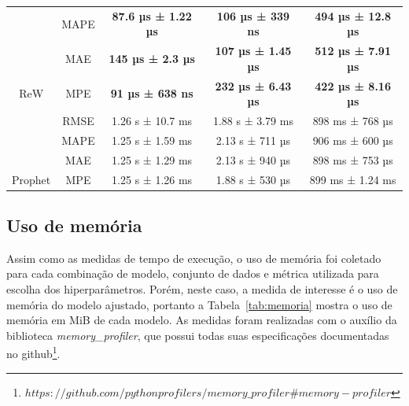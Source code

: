 \begin{table}[htbp]
\begin{tabular}{@{}ccccc@{}}
                                  & MAPE                      & \multicolumn{1}{c}{\textbf{87.6 µs ± 1.22 µs}} & \multicolumn{1}{c}{\textbf{106 µs ± 339 ns}}  & \textbf{494 µs ± 12.8 µs} \\
                                  & MAE                       & \multicolumn{1}{c}{\textbf{145 µs ± 2.3 µs}}   & \multicolumn{1}{c}{\textbf{107 µs ± 1.45 µs}} & \textbf{512 µs ± 7.91 µs} \\
        \multirow{-4}{*}{ReW}     & MPE                       & \multicolumn{1}{c}{\textbf{91 µs ± 638 ns}}    & \multicolumn{1}{c}{\textbf{232 µs ± 6.43 µs}} & \textbf{422 µs ± 8.16 µs} \\ \midrule
                                  & RMSE                      & \multicolumn{1}{c}{1.26 s ± 10.7 ms}           & \multicolumn{1}{c}{1.88 s ± 3.79 ms}          & 898 ms ± 768 µs           \\
                                  & MAPE                      & \multicolumn{1}{c}{1.25 s ± 1.59 ms}           & \multicolumn{1}{c}{2.13 s ± 711 µs}           & 906 ms ± 600 µs           \\
                                  & MAE                       & \multicolumn{1}{c}{1.25 s ± 1.29 ms}           & \multicolumn{1}{c}{2.13 s ± 940 µs}           & 898 ms ± 753 µs           \\
        \multirow{-4}{*}{Prophet} & MPE                       & \multicolumn{1}{c}{1.25 s ± 1.26 ms}           & \multicolumn{1}{c}{1.88 s ± 530 µs}           & 899 ms ± 1.24 ms          \\ \bottomrule
    \end{tabular}
\end{table}

\FloatBarrier

\subsection{Uso de memória}
Assim como as medidas de tempo de execução, o uso de memória foi coletado para cada combinação de modelo, conjunto de dados e métrica utilizada para escolha dos hiperparâmetros. Porém, neste caso, a medida de interesse é o uso de memória do modelo ajustado, portanto a Tabela~\ref{tab:memoria} mostra o uso de memória em MiB de cada modelo. As medidas foram realizadas com o auxílio da biblioteca \textit{memory\_profiler}, que possui todas suas especificações documentadas no github\footnote{$https://github.com/pythonprofilers/memory\_profiler\#memory-profiler$}.

